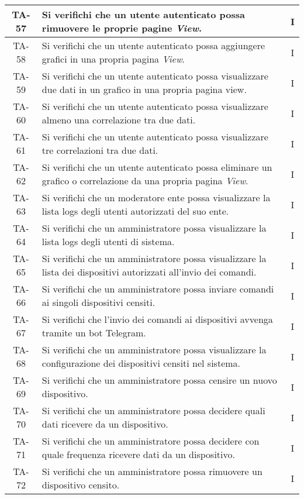 \begin{center}
\begin{longtable}{|c|p{10cm}|c|}
			 TA-57 & Si verifichi che un utente autenticato possa rimuovere le proprie pagine \textit{View}. & I \\
			 \hline
			 TA-58 & Si verifichi che un utente autenticato possa aggiungere grafici in una propria pagina  \textit{View}. & I \\
			 \hline
			 TA-59 & Si verifichi che un utente autenticato possa visualizzare due dati in un grafico in una propria pagina view. & I \\
			 \hline
			 TA-60 & Si verifichi che un utente autenticato possa visualizzare almeno una correlazione tra due dati. & I \\
			 \hline
			 TA-61 & Si verifichi che un utente autenticato possa visualizzare tre correlazioni tra due dati. & I \\
			 \hline
			 TA-62 & Si verifichi che un utente autenticato possa eliminare un grafico o correlazione da una propria pagina \textit{View}. & I \\
			 \hline
			 TA-63 & Si verifichi che un moderatore ente possa visualizzare la lista logs degli utenti autorizzati del suo ente. & I \\
			 \hline
			 TA-64 & Si verifichi che un amministratore possa visualizzare la lista logs degli utenti di sistema. & I \\
			 \hline
			 TA-65 & Si verifichi che un amministratore possa visualizzare la lista dei dispositivi autorizzati all'invio dei comandi. & I \\
			 \hline
			 TA-66 & Si verifichi che un amministratore possa inviare comandi ai singoli dispositivi censiti. & I \\
			 \hline
			 TA-67 & Si verifichi che l'invio dei comandi ai dispositivi avvenga tramite un bot Telegram. & I \\
			 \hline
			 TA-68 & Si verifichi che un amministratore possa visualizzare la configurazione dei dispositivi censiti nel sistema. & I \\
			 \hline
			 TA-69 & Si verifichi che un amministratore possa censire un nuovo dispositivo. & I \\
			 \hline
			 TA-70 & Si verifichi che un amministratore possa decidere quali dati ricevere da un dispositivo. & I \\
			 \hline
			 TA-71 & Si verifichi che un amministratore possa decidere con quale frequenza ricevere dati da un dispositivo. & I \\
			 \hline
			 TA-72 & Si verifichi che un amministratore possa rimuovere un dispositivo censito. & I \\

\end{longtable}
\end{center}
